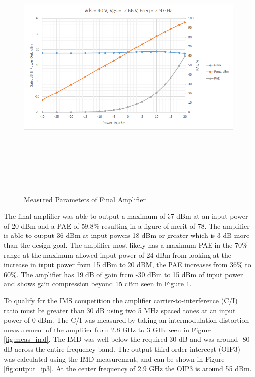  \begin{figure}
  \centering
  \includegraphics[width=5in,height=5in,keepaspectratio]{figures/test/meas_singletone}\\
  \caption{Measured Parameters of Final Amplifier}
  \label{fig:meas_singlesweep}

\end{figure}

 The final amplifier was able to output a maximum of 37 dBm at an input power of 20 dBm and a PAE of 59.8\% resulting in a figure of merit of 78. The amplifier is able to output 36 dBm at input powers 18 dBm or greater which is 3 dB more than the design goal. The amplifier most likely has a maximum PAE in the 70\% range at the maximum allowed input power of 24 dBm from looking at the increase in input power from 15 dBm to 20 dBM, the PAE increases from 36\% to 60\%. The amplifier has 19 dB of gain from -30 dBm to 15 dBm of input power and shows gain compression beyond 15 dBm seen in Figure \ref{fig:meas_singlesweep}.

 To qualify for the IMS competition the amplifier carrier-to-interference (C/I) ratio must be greater than 30 dB using two 5 MHz spaced tones at an input power of 0 dBm. The C/I was measured by taking an intermodulation distortion measurement of the amplifier from 2.8 GHz to 3 GHz seen in Figure \ref{fig:meas_imd}. The IMD was well below the required 30 dB and was around -80 dB across the entire frequency band. The output third order intercept (OIP3) was calculated using the IMD measurement, and can be shown in Figure \ref{fig:output_ip3}. At the center frequency of 2.9 GHz the OIP3 is around 55 dBm.

